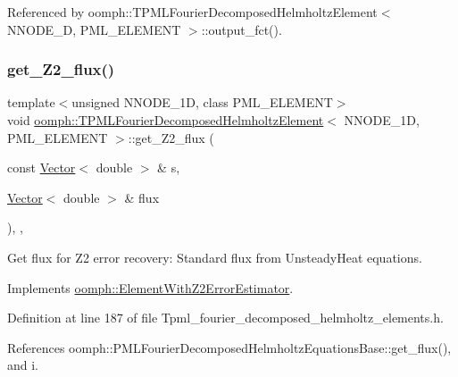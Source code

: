 Referenced by oomph\+::\+T\+P\+M\+L\+Fourier\+Decomposed\+Helmholtz\+Element$<$ N\+N\+O\+D\+E\+\_\+D, P\+M\+L\+\_\+\+E\+L\+E\+M\+E\+N\+T $>$\+::output\+\_\+fct().

\mbox{\label{classoomph_1_1TPMLFourierDecomposedHelmholtzElement_a1bcc85857f0f00cca7748a3e9cbcee32}} 
\subsubsection{\texorpdfstring{get\+\_\+\+Z2\+\_\+flux()}{get\_Z2\_flux()}}
{\footnotesize\ttfamily template$<$unsigned N\+N\+O\+D\+E\+\_\+1D, class P\+M\+L\+\_\+\+E\+L\+E\+M\+E\+NT$>$ \\
void \hyperlink{classoomph_1_1TPMLFourierDecomposedHelmholtzElement}{oomph\+::\+T\+P\+M\+L\+Fourier\+Decomposed\+Helmholtz\+Element}$<$ N\+N\+O\+D\+E\+\_\+1D, P\+M\+L\+\_\+\+E\+L\+E\+M\+E\+NT $>$\+::get\+\_\+\+Z2\+\_\+flux (\begin{DoxyParamCaption}\item[{const \hyperlink{classoomph_1_1Vector}{Vector}$<$ double $>$ \&}]{s,  }\item[{\hyperlink{classoomph_1_1Vector}{Vector}$<$ double $>$ \&}]{flux }\end{DoxyParamCaption})\hspace{0.3cm}{\ttfamily [inline]}, {\ttfamily [protected]}, {\ttfamily [virtual]}}



Get \textquotesingle{}flux\textquotesingle{} for Z2 error recovery\+: Standard flux from Unsteady\+Heat equations. 



Implements \hyperlink{classoomph_1_1ElementWithZ2ErrorEstimator_a5688ff5f546d81771cabad82ca5a7556}{oomph\+::\+Element\+With\+Z2\+Error\+Estimator}.



Definition at line 187 of file Tpml\+\_\+fourier\+\_\+decomposed\+\_\+helmholtz\+\_\+elements.\+h.



References oomph\+::\+P\+M\+L\+Fourier\+Decomposed\+Helmholtz\+Equations\+Base\+::get\+\_\+flux(), and i.


